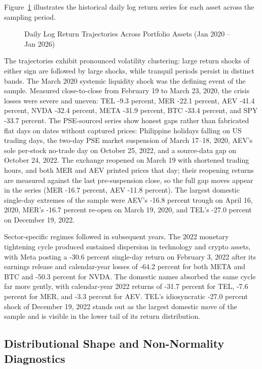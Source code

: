 Figure~\ref{fig:ts_returns} illustrates the historical daily log return series for each asset across the sampling period.

\begin{figure}[H]
  \centering
  \caption{Daily Log Return Trajectories Across Portfolio Assets (Jan 2020 -- Jan 2026)}
  \label{fig:ts_returns}
\end{figure}

The trajectories exhibit pronounced volatility clustering: large return shocks of either sign are followed by large shocks, while tranquil periods persist in distinct bands. The March 2020 systemic liquidity shock was the defining event of the sample. Measured close-to-close from February 19 to March 23, 2020, the crisis losses were severe and uneven: TEL -9.3 percent, MER -22.1 percent, AEV -41.4 percent, NVDA -32.4 percent, META -31.9 percent, BTC -33.4 percent, and SPY -33.7 percent. The PSE-sourced series show honest gaps rather than fabricated flat days on dates without captured prices: Philippine holidays falling on US trading days, the two-day PSE market suspension of March 17--18, 2020, AEV's sole per-stock no-trade day on October 25, 2022, and a source-data gap on October 24, 2022. The exchange reopened on March 19 with shortened trading hours, and both MER and AEV printed prices that day; their reopening returns are measured against the last pre-suspension close, so the full gap moves appear in the series (MER -16.7 percent, AEV -11.8 percent). The largest domestic single-day extremes of the sample were AEV's -16.8 percent trough on April 16, 2020, MER's -16.7 percent re-open on March 19, 2020, and TEL's -27.0 percent on December 19, 2022.

Sector-specific regimes followed in subsequent years. The 2022 monetary tightening cycle produced sustained dispersion in technology and crypto assets, with Meta posting a -30.6 percent single-day return on February 3, 2022 after its earnings release and calendar-year losses of -64.2 percent for both META and BTC and -50.3 percent for NVDA. The domestic names absorbed the same cycle far more gently, with calendar-year 2022 returns of -31.7 percent for TEL, -7.6 percent for MER, and -3.3 percent for AEV. TEL's idiosyncratic -27.0 percent shock of December 19, 2022 stands out as the largest domestic move of the sample and is visible in the lower tail of its return distribution.

\subsection{Distributional Shape and Non-Normality Diagnostics}

